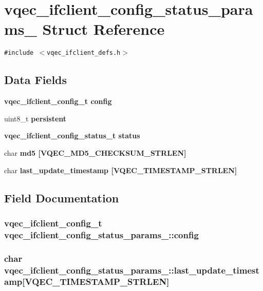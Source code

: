 \section{vqec\_\-ifclient\_\-config\_\-status\_\-params\_\- Struct Reference}
\label{structvqec__ifclient__config__status__params__}
{\tt \#include $<$vqec\_\-ifclient\_\-defs.h$>$}

\subsection*{Data Fields}
\begin{CompactItemize}
\item 
\bf{vqec\_\-ifclient\_\-config\_\-t} \bf{config}
\item 
uint8\_\-t \bf{persistent}
\item 
\bf{vqec\_\-ifclient\_\-config\_\-status\_\-t} \bf{status}
\item 
char \bf{md5} [VQEC\_\-MD5\_\-CHECKSUM\_\-STRLEN]
\item 
char \bf{last\_\-update\_\-timestamp} [VQEC\_\-TIMESTAMP\_\-STRLEN]
\end{CompactItemize}


\subsection{Field Documentation}
\subsubsection{\setlength{\rightskip}{0pt plus 5cm}\bf{vqec\_\-ifclient\_\-config\_\-t} \bf{vqec\_\-ifclient\_\-config\_\-status\_\-params\_\-::config}}\label{structvqec__ifclient__config__status__params___747e9aa7909ea5588f06cc8c87fa6320}


\subsubsection{\setlength{\rightskip}{0pt plus 5cm}char \bf{vqec\_\-ifclient\_\-config\_\-status\_\-params\_\-::last\_\-update\_\-timestamp}[VQEC\_\-TIMESTAMP\_\-STRLEN]}\label{structvqec__ifclient__config__status__params___29b9d3b512ce2cc1c63ef7f9240c5caa}



